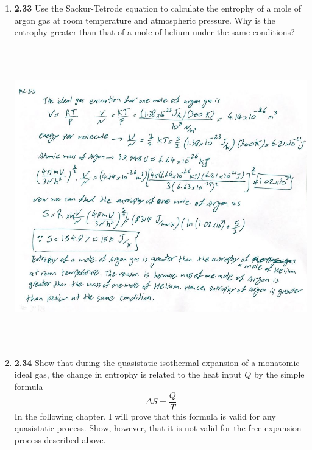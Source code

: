 \documentclass[fleqn]{article}
\begin{document}
\begin{enumerate}
    \item \textbf{2.33} Use the Sackur-Tetrode equation to calculate the entrophy of a mole of argon gas at room 
    temperature and atmospheric pressure. Why is the entrophy greater than that of a mole of helium under the same conditions?

    \begin{center}
      \includegraphics[height=13cm, width=14cm]{5.JPG}
    \end{center}

    \pagebreak

    \item \textbf{2.34} Show that during the quasistatic isothermal expansion of a monatomic ideal gas, the change in entrophy is
    related to the heat input $Q$ by the simple formula
    $$
      \Delta S=\dfrac{Q}{T}
    $$
    In the following chapter, I will prove that this formula is valid for any quasistatic process. Show, however, that it is not valid
    for the free expansion process described above.


\end{enumerate}
\end{document}
